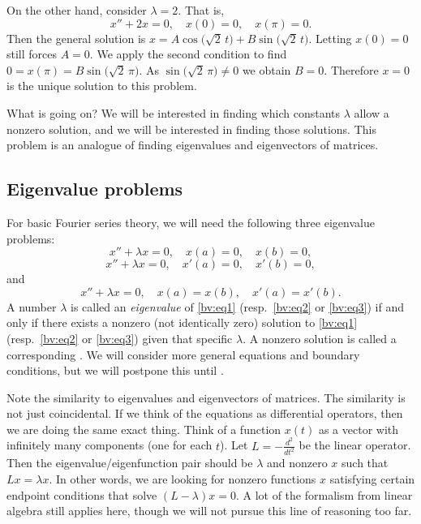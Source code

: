 \begin{example}
On the other hand, consider $\lambda = 2$.  That is,
\begin{equation*}
x'' + 2 x = 0, \quad x(0) = 0, \quad x(\pi) = 0.
\end{equation*}
Then the general solution is
$x= A \cos \bigl( \sqrt{2}\,t\bigr)
+ B \sin \bigl( \sqrt{2}\,t\bigr)$.
Letting $x(0) = 0$ still forces $A = 0$.
We apply the second condition to find
$0=x(\pi) = B \sin \bigl( \sqrt{2}\,\pi\bigr)$.
As $\sin \bigl( \sqrt{2}\,\pi\bigr) \not= 0$ we obtain
$B = 0$.  Therefore $x=0$ is the unique solution to this problem.
\end{example}

What is going on?  We will be interested in finding which
constants $\lambda$ allow a nonzero solution, and we will be interested in
finding those solutions.  This problem is an analogue of finding
eigenvalues and eigenvectors of matrices.  

\subsection{Eigenvalue problems}

For basic Fourier series theory, we will need
the following three eigenvalue problems:
\begin{equation} \label{bv:eq1}
x'' + \lambda x = 0, \quad x(a) = 0, \quad x(b) = 0 ,
\end{equation}
\begin{equation} \label{bv:eq2}
x'' + \lambda x = 0, \quad x'(a) = 0, \quad x'(b) = 0 ,
\end{equation}
and
\begin{equation} \label{bv:eq3}
x'' + \lambda x = 0, \quad x(a) = x(b), \quad x'(a) = x'(b) .
\end{equation}
A number $\lambda$ is called an
\emph{eigenvalue}
of \eqref{bv:eq1}
(resp.\ \eqref{bv:eq2} or \eqref{bv:eq3}) if and only if
there exists a nonzero (not identically zero) solution to \eqref{bv:eq1}
(resp.\ \eqref{bv:eq2} or \eqref{bv:eq3})
given that specific $\lambda$.  A
nonzero solution is called a corresponding
\emph{}.
We will consider more general equations and boundary conditions,
but we will postpone this until
.

Note the similarity to eigenvalues and eigenvectors of matrices.  The
similarity is not just coincidental.  If we think of the equations as
differential operators, then we are doing the same exact thing.
Think of a function $x(t)$
as a vector with infinitely many components (one for each $t$).
Let $L = -\frac{d^2}{{dt}^2}$ be the linear operator.
Then the eigenvalue/eigenfunction pair should be $\lambda$ and
nonzero $x$ such that $Lx = \lambda x$.
In other words,
we are looking for nonzero functions $x$
satisfying certain endpoint conditions that solve
$(L- \lambda)x = 0$.  A lot of the formalism from linear algebra still
applies here, though we will not pursue this line of reasoning too far.

